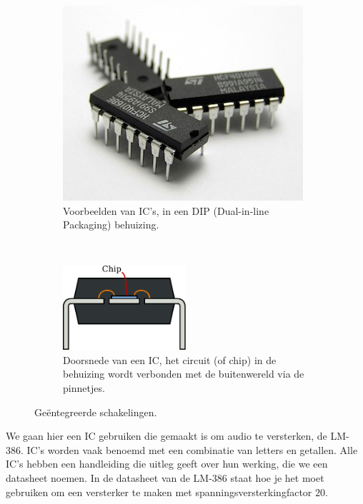 \documentclass{article}
\begin{document}
			\begin{figure}[htbp]
			\centering
				\begin{subfigure}[b]{0.45\linewidth}
					\centering
					\includegraphics[width=\textwidth]{IC}
					\caption{Voorbeelden van IC's, in een DIP (Dual-in-line Packaging) behuizing.}
					\label{subfig:IC_foto}
				\end{subfigure}
				~
				\begin{subfigure}[b]{0.45\linewidth}
					\centering
				\includegraphics[width=0.5\textwidth]{IC_doorsnede}
				\caption{Doorsnede van een IC, het circuit (of chip) in de behuizing wordt verbonden met de buitenwereld via de pinnetjes. }
				\label{subfig:IC_doorsnede}
				\end{subfigure}
				\caption{Ge\"entegreerde schakelingen.}
				\label{fig:IC}
			\end{figure}

			We gaan hier een IC gebruiken die gemaakt is om audio te versterken, de LM-386. IC's worden vaak benoemd met een combinatie van letters en getallen. Alle IC's hebben een handleiding die uitleg geeft over hun werking, die we een datasheet noemen. In de datasheet van de LM-386 staat hoe je het moet gebruiken om een versterker te maken met spanningsversterkingfactor $20$.
\end{document}
